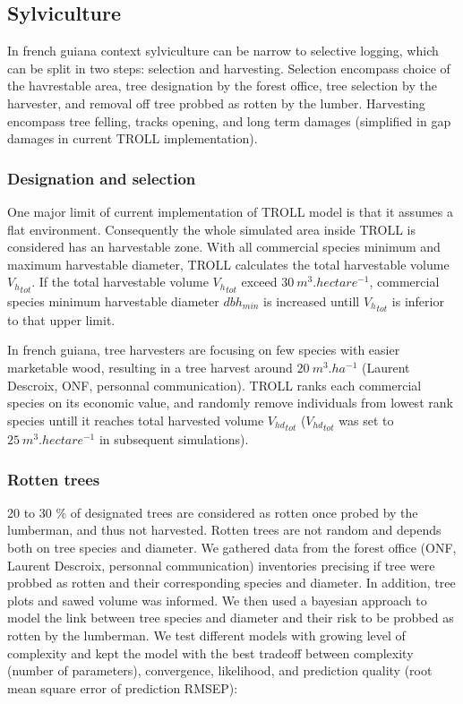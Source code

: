\documentclass[12pt,]{article}
\theoremstyle{definition}
\theoremstyle{definition}
\theoremstyle{remark}
\begin{document}
\subsection{Sylviculture}\label{sylviculture}

In french guiana context sylviculture can be narrow to selective
logging, which can be split in two steps: selection and harvesting.
Selection encompass choice of the havrestable area, tree designation by
the forest office, tree selection by the harvester, and removal off tree
probbed as rotten by the lumber. Harvesting encompass tree felling,
tracks opening, and long term damages (simplified in gap damages in
current TROLL implementation).

\subsubsection{Designation and
selection}\label{designation-and-selection}

One major limit of current implementation of TROLL model is that it
assumes a flat environment. Consequently the whole simulated area inside
TROLL is considered has an harvestable zone. With all commercial species
minimum and maximum harvestable diameter, TROLL calculates the total
harvestable volume \({V_h}_{tot}\). If the total harvestable volume
\({V_h}_{tot}\) exceed \(30~m^3.hectare^{-1}\), commercial species
minimum harvestable diameter \(dbh_{min}\) is increased untill
\({V_h}_{tot}\) is inferior to that upper limit.

In french guiana, tree harvesters are focusing on few species with
easier marketable wood, resulting in a tree harvest around
\(20~m^3.ha^{-1}\) (Laurent Descroix, ONF, personnal communication).
TROLL ranks each commercial species on its economic value, and randomly
remove individuals from lowest rank species untill it reaches total
harvested volume \({V_{hd}}_{tot}\) (\({V_{hd}}_{tot}\) was set to
\(25~m^3.hectare^{-1}\) in subsequent simulations).

\subsubsection{Rotten trees}\label{rotten-trees}

20 to 30 \% of designated trees are considered as rotten once probed by
the lumberman, and thus not harvested. Rotten trees are not random and
depends both on tree species and diameter. We gathered data from the
forest office (ONF, Laurent Descroix, personnal communication)
inventories precising if tree were probbed as rotten and their
corresponding species and diameter. In addition, tree plots and sawed
volume was informed. We then used a bayesian approach to model the link
between tree species and diameter and their risk to be probbed as rotten
by the lumberman. We test different models with growing level of
complexity and kept the model with the best tradeoff between complexity
(number of parameters), convergence, likelihood, and prediction quality
(root mean square error of prediction RMSEP):
\end{document}
